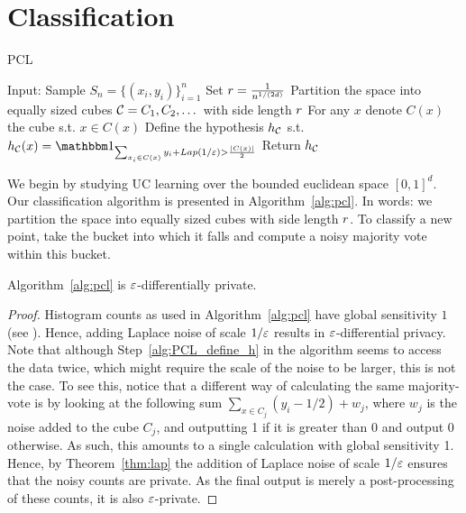 \documentclass[12pt,a4paper,oneside,onecolumn]{book}
\begin{document}
\section{Classification}
\label{sec:classification}


\begin{algorithm}
  \caption{PCL}\label{alg:pcl}
  \begin{algorithmic}[1]
    \State Input: Sample $S_n = \{(x_i,y_i)\}_{i=1}^n$ %
    \State Set $r=\frac{1}{n^{1/(2d)}}$ %
    \State Partition the space into equally sized cubes $\mathcal{C} = C_1,C_2,\dots$ with side length $r$
    \State For any $x$ denote $C(x)$ the cube s.t. $x \in C(x)$
    \State Define the hypothesis $h_{\mathcal{C}}$ s.t.
    $h_{\partition}(x) = \indicator{\sum_{x_i\in C(x)} y_i + Lap(1/\eps) > \frac{|C(x)|}{2}}$ \label{alg:PCL_define_h}
    \State Return $h_{\mathcal{C}}$
  \end{algorithmic}
\end{algorithm}

We begin by studying UC learning over the bounded euclidean space $[0,1]^d$. Our classification algorithm is presented in Algorithm~\ref{alg:pcl}. In words: we partition the space into  equally sized cubes with side length $r$.
To classify a new point, take the bucket into which it falls 
and compute a noisy majority vote within this bucket.



\begin{theorem}
Algorithm~\ref{alg:pcl} is $\varepsilon$-differentially private.
\end{theorem}

\begin{proof}
Histogram counts as used in Algorithm~\ref{alg:pcl} have global sensitivity $1$ (see \citep{dwork2014algorithmic}). 
Hence, adding Laplace noise of scale $1/\varepsilon$ results in $\varepsilon$-differential privacy.
Note that although Step~\ref{alg:PCL_define_h} in the algorithm seems to access the data twice, which might require the scale of the noise to be larger, this is not the case. To see this, notice that a different way of calculating the same majority-vote is by looking at the following sum
$\sum_{x\in C_j}(y_i - 1/2) + w_j$, where $w_j$ is the noise added to the cube $C_j$, and outputting 1 if it is greater than 0 and output 0 otherwise.
As such, this amounts to a single calculation with global sensitivity 1. 
Hence, by Theorem~\ref{thm:lap} the addition of Laplace noise of scale $1/\varepsilon$ ensures that the noisy counts are private. As the final output is merely a post-processing of these counts, it is also $\varepsilon$-private.
\end{proof}
\end{document}

